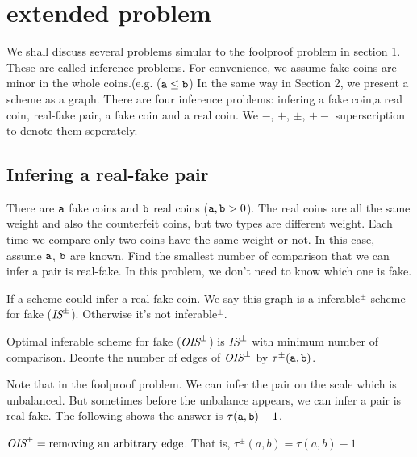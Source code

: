 \section{extended problem}
We shall discuss several problems simular to the foolproof problem in section 1. These are called inference problems. For convenience, we assume fake coins are minor in the whole coins.(e.g. ($\mathtt{a}\leq \mathtt{b} $)
In the same way in Section 2, we present a scheme as a graph. There are four inference problems: infering a fake coin,a real coin, real-fake pair, a fake coin and a real coin. We $-$, $+$, $\pm$, $+-$ superscription to denote them seperately.

\subsection*{Infering a real-fake pair}
{
\setlength{\leftskip}{1cm}
\setlength{\rightskip}{1cm}
There are $\mathtt{a}$ fake coins and $\mathtt{b}$ real coins ($\mathtt{a}, \mathtt{b} > 0$). The real coins are all the same weight and also the counterfeit coins, but two  types are different weight. Each time we compare only two coins have the same weight or not. In this case, assume $\mathtt{a}$, $\mathtt{b}$ are known.
Find the smallest number of comparison that we can infer a pair is real-fake. In this problem, we don't need to know which one is fake.\\

}
\begin{definition}
If a scheme could infer a real-fake coin. We say this graph is a inferable$^\pm$ scheme for fake ($\text{\it IS}^\pm$). Otherwise it's not inferable$^\pm$.

Optimal inferable scheme for fake ($\text{\it OIS}^\pm$) is $\text{\it IS}^\pm$ with minimum number of comparison.
Deonte the number of edges of $\text{\it OIS}^\pm$ by $\tau^\pm(\mathtt{a},\mathtt{b})$.
\end{definition}

Note that in the foolproof problem. We can infer the pair on the scale which is unbalanced. But sometimes before the unbalance appears, we can infer a pair is real-fake. The following shows the answer is $\tau(\mathtt{a},\mathtt{b})-1$.

\begin{lemma}
$\text{\it OIS}^\pm= \text{removing an arbitrary edge}$. That is, $\tau^\pm(a,b)=\tau(a,b)-1$
\end{lemma}

